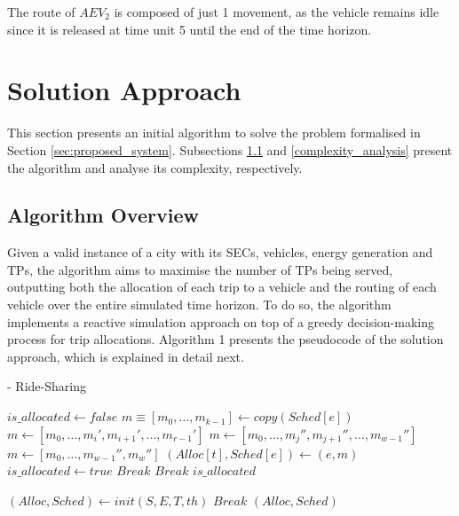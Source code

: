 The route of $AEV_2$ is composed of just 1 movement, as the vehicle remains idle since it is released at time unit 5 until the end of the time horizon. 


\section{Solution Approach}
\label{sec:solution_approach:chap2}

This section presents an initial algorithm to solve the problem formalised in Section \ref{sec:proposed_system}.  Subsections \ref{detailed_explanation} and \ref{complexity_analysis} present the algorithm and analyse its complexity, respectively.

\subsection{Algorithm Overview}
\label{detailed_explanation}

Given a valid instance of a city with its SECs, vehicles, energy generation and TPs, the algorithm aims to maximise the number of TPs being served, outputting both the allocation of each trip to a vehicle and the routing of each vehicle over the entire simulated time horizon. To do so, the algorithm implements a reactive simulation approach on top of a greedy decision-making process for trip allocations.  Algorithm 1 presents the pseudocode of the solution approach, which is explained in detail next. 
\begin{algorithm}
\caption{- Ride-Sharing}
\begin{small}
\begin{algorithmic}
\State $is\_allocated\gets false$
\State $m \equiv [ m_0, \ldots, m_{k-1} ] \gets copy(Sched[e])$
		\State $m\gets [ m_0, \ldots,  m_i', m_{i+1}', \ldots,  m_{r-1}' ]$
				\State $m\gets [ m_0,  \ldots, m_j'',  m_{j+1}'', \ldots,  m_{w-1}'' ]$	
					\State $m\gets [ m_0,  \ldots, m_{w-1}'', m_w'' ]$
					\State $(Alloc[t], Sched[e]) \gets (e, m)$
					\State $is\_allocated \gets true$	
				\EndIf
				\State $Break$				
			\EndIf	
		\EndFor
		\State $Break$
	\EndIf
\EndFor
\Return $is\_allocated$
\EndFunction
\\\hrulefill
\end{algorithmic}
\begin{algorithmic}
\State $(Alloc, Sched)\gets init(S, E, T, th)$
			\State $Break$
		\EndIf
	\EndFor	
\EndFor
\Return $(Alloc, Sched)$
\EndFunction
\end{algorithmic}
\end{small}
\end{algorithm}



